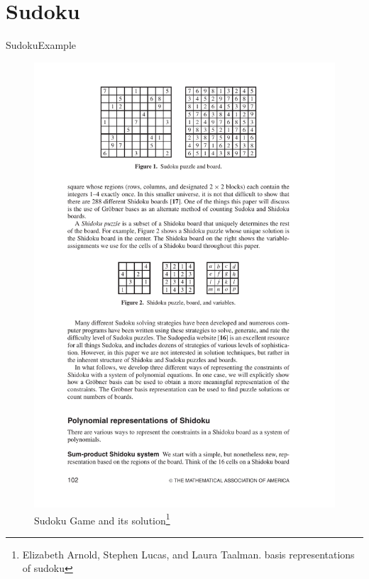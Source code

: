 \documentclass[aspectratio=169, handout, 10pt, hyperref=colorlinks]{beamer}
\begin{document}
\section{Sudoku}
\begin{frame}{Sudoku}{Example}
    \begin{figure}[H]
        \centering
        \includegraphics{sudoku.pdf}
        \caption{Sudoku Game and its solution\footnote{\tiny Elizabeth Arnold, Stephen Lucas, and Laura Taalman. \Grob basis representations of sudoku}}
        \label{fig:sudoku}
    \end{figure}
\end{frame}
\end{document}
